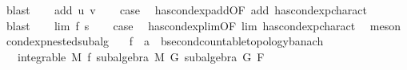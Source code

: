 \begin{isabellebody}
\ blast\isanewline
{}\isamarkupfalse%
\isanewline
\ \ \isamarkupfalse%
\ {\isacharparenleft}{\kern0pt}add\ u\ v{\isacharparenright}{\kern0pt}\isanewline
\ \ \isamarkupfalse%
\ {\isacharquery}{\kern0pt}case\ \isamarkupfalse%
\ has{\isacharunderscore}{\kern0pt}cond{\isacharunderscore}{\kern0pt}exp{\isacharunderscore}{\kern0pt}add{\isacharbrackleft}{\kern0pt}OF\ add{\isacharparenleft}{\kern0pt}{}{\isacharcomma}{\kern0pt}{}{\isacharparenright}{\kern0pt}{\isacharbrackright}{\kern0pt}\ has{\isacharunderscore}{\kern0pt}cond{\isacharunderscore}{\kern0pt}exp{\isacharunderscore}{\kern0pt}charact{\isacharparenleft}{\kern0pt}{}{\isacharparenright}{\kern0pt}\ \isamarkupfalse%
\ blast\isanewline
{}\isamarkupfalse%
\isanewline
\ \ \isamarkupfalse%
\ {\isacharparenleft}{\kern0pt}lim\ f\ s{\isacharparenright}{\kern0pt}\isanewline
\ \ \isamarkupfalse%
\ {\isacharquery}{\kern0pt}case\ \isamarkupfalse%
\ has{\isacharunderscore}{\kern0pt}cond{\isacharunderscore}{\kern0pt}exp{\isacharunderscore}{\kern0pt}lim{\isacharbrackleft}{\kern0pt}OF\ lim{\isacharparenleft}{\kern0pt}{}{\isacharcomma}{\kern0pt}{}{\isacharcomma}{\kern0pt}{}{\isacharcomma}{\kern0pt}{}{\isacharcomma}{\kern0pt}{}{\isacharparenright}{\kern0pt}{\isacharbrackright}{\kern0pt}\ has{\isacharunderscore}{\kern0pt}cond{\isacharunderscore}{\kern0pt}exp{\isacharunderscore}{\kern0pt}charact{\isacharparenleft}{\kern0pt}{}{\isacharparenright}{\kern0pt}\ \isamarkupfalse%
\ meson\isanewline
{}\isamarkupfalse%
%
\endisatagproof
{\isafoldproof}%
%
\isadelimproof
\isanewline
%
\endisadelimproof
\isanewline
{}\isamarkupfalse%
\ cond{\isacharunderscore}{\kern0pt}exp{\isacharunderscore}{\kern0pt}nested{\isacharunderscore}{\kern0pt}subalg{\isacharcolon}{\kern0pt}\isanewline
\ \ \ f\ {\isacharcolon}{\kern0pt}{\isacharcolon}{\kern0pt}\ {\isachardoublequoteopen}{\isacharprime}{\kern0pt}a\ {\isasymRightarrow}\ {\isacharprime}{\kern0pt}b{\isacharcolon}{\kern0pt}{\isacharcolon}{\kern0pt}{\isacharbraceleft}{\kern0pt}second{\isacharunderscore}{\kern0pt}countable{\isacharunderscore}{\kern0pt}topology{\isacharcomma}{\kern0pt}banach{\isacharbraceright}{\kern0pt}{\isachardoublequoteclose}\isanewline
\ \ \ {\isachardoublequoteopen}integrable\ M\ f{\isachardoublequoteclose}\ {\isachardoublequoteopen}subalgebra\ M\ G{\isachardoublequoteclose}\ {\isachardoublequoteopen}subalgebra\ G\ F{\isachardoublequoteclose}\isanewline

\end{isabellebody}
